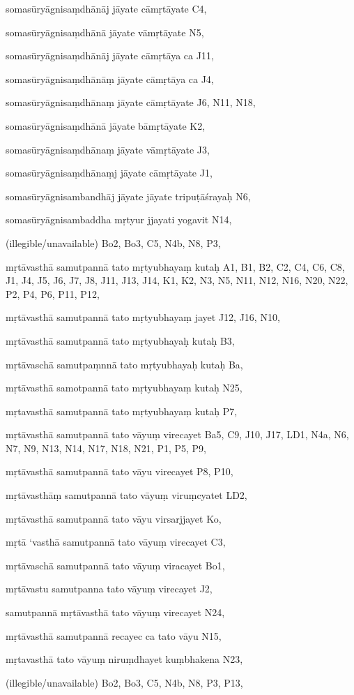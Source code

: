 \begin{marma}[hp02_028]
\item[somasūryāgnisaṃdhānāj jāyate cāmṛtāyate] C4,
\item[somasūryāgnisaṃdhānā jāyate vāmṛtāyate] N5,
\item[somasūryāgnisaṃdhānāj jāyate cāmṛtāya ca] J11,
\item[somasūryāgnisaṃdhānāṃ  jāyate cāmṛtāya ca] J4, 
\item[somasūryāgnisaṃdhānaṃ jāyate cāmṛtāyate] J6, N11, N18,
\item[somasūryāgnisaṃdhānā jāyate bāmṛtāyate] K2,
\item[somasūryāgnisaṃdhānaṃ jāyate vāmṛtāyate] J3,
\item[somasūryāgnisaṃdhānaṃj jāyate cāmṛtāyate] J1,
\item[somasūryāgnisambandhāj jāyate jāyate tripuṭāśrayaḥ] N6,
\item[somasūryāgnisambaddha mṛtyur jjayati yogavit] N14, 
  \item[(illegible/unavailable)] Bo2, Bo3, C5, N4b, N8, P3,

  \begin{description}
  \end{description}


\item[mṛtāvasthā samutpannā tato mṛtyubhayaṃ kutaḥ] A1, B1, B2, C2, C4, C6, C8, J1, J4, J5, J6, J7, J8, J11, J13, J14, K1, K2, N3, N5, N11, N12, N16, N20, N22, P2, P4, P6, P11, P12, 
\item[mṛtāvasthā samutpannā tato mṛtyubhayaṃ jayet] J12, J16, N10,
\item[mṛtāvasthā samutpannā tato mṛtyubhayaḥ kutaḥ] B3,
\item[mṛtāvaschā samutpaṃnnā tato mṛtyubhayaḥ kutaḥ] Ba,
\item[mṛtāvasthā samotpannā tato mṛtyubhayaṃ kutaḥ] N25,
\item[mṛtavasthā samutpannā tato mṛtyubhayaṃ kutaḥ] P7,
\item[mṛtāvasthā samutpannā tato vāyuṃ virecayet] Ba5, C9, J10, J17, LD1, N4a, N6, N7, N9, N13, N14, N17, N18, N21, P1, P5, P9, 
\item[mṛtāvasthā samutpannā tato vāyu virecayet] P8, P10, 
\item[mṛtāvasthāṃ samutpannā tato vāyuṃ viruṃcyatet] LD2,
\item[mṛtāvasthā samutpannā tato vāyu virsarjjayet] Ko,
\item[mṛtā ‘vasthā samutpannā tato vāyuṃ virecayet] C3, 
\item[mṛtāvaschā samutpannā tato vāyuṃ viracayet] Bo1,
\item[mṛtāvastu samutpanna tato vāyuṃ virecayet] J2,
\item[samutpannā mṛtāvasthā tato vāyuṃ virecayet] N24,
\item[mṛtāvasthā samutpannā recayec ca tato vāyu] N15,
\item[mṛtavasthā tato vāyuṃ niruṃdhayet kuṃbhakena] N23,
\item[(illegible/unavailable)] Bo2, Bo3, C5, N4b, N8, P3, P13, 


\end{marma}
